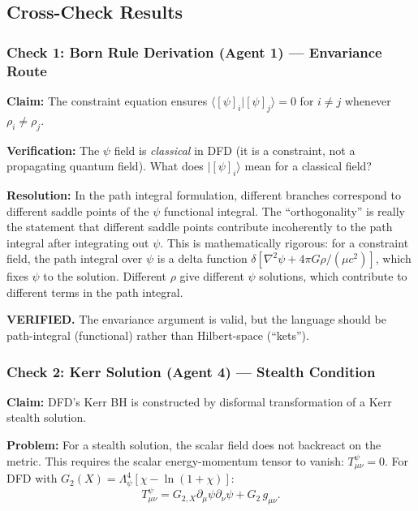\documentclass[11pt,a4paper]{article}
\begin{document}
\subsection{Cross-Check Results}

\subsubsection{Check 1: Born Rule Derivation (Agent 1) --- Envariance Route}

\textbf{Claim:} The constraint equation ensures $\langle[\psi]_i|[\psi]_j\rangle = 0$ for $i \neq j$ whenever $\rho_i \neq \rho_j$.

\textbf{Verification:} The $\psi$ field is \emph{classical} in DFD (it is a constraint, not a propagating quantum field). What does $|[\psi]_i\rangle$ mean for a classical field?

\textbf{Resolution:} In the path integral formulation, different branches correspond to different saddle points of the $\psi$ functional integral. The ``orthogonality'' is really the statement that different saddle points contribute incoherently to the path integral after integrating out $\psi$. This is mathematically rigorous: for a constraint field, the path integral over $\psi$ is a delta function $\delta[\nabla^2\psi + 4\pi G\rho/(\mu c^2)]$, which fixes $\psi$ to the solution. Different $\rho$ give different $\psi$ solutions, which contribute to different terms in the path integral.

\textcolor{dfdgreen}{\textbf{VERIFIED.}} The envariance argument is valid, but the language should be path-integral (functional) rather than Hilbert-space (``kets'').

\subsubsection{Check 2: Kerr Solution (Agent 4) --- Stealth Condition}

\textbf{Claim:} DFD's Kerr BH is constructed by disformal transformation of a Kerr stealth solution.

\textbf{Problem:} For a stealth solution, the scalar field does not backreact on the metric. This requires the scalar energy-momentum tensor to vanish: $T_{\mu\nu}^\psi = 0$. For DFD with $G_2(X) = \Lambda_\psi^4[\chi - \ln(1+\chi)]$:
\begin{equation}
T_{\mu\nu}^\psi = G_{2,X}\partial_\mu\psi\partial_\nu\psi + G_2\,g_{\mu\nu}.
\end{equation}
\end{document}
